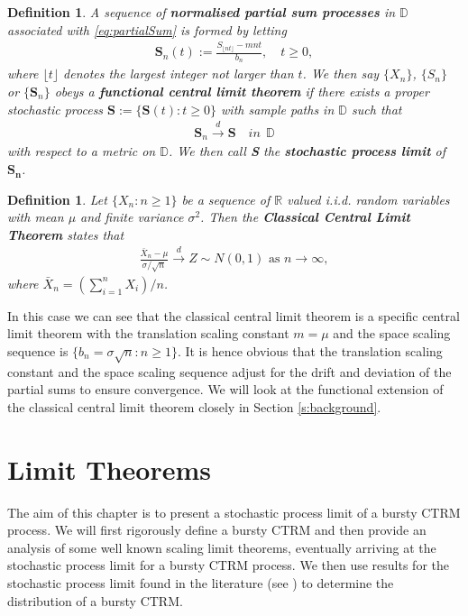 \documentclass[honours,12pt]{unswthesis}
\newcommand{\R}{\mathbb{R}}
\newcommand{\1}{\mathbf 1}
\newcommand{\Floor}[1]{{\lfloor {#1} \rfloor}}
\newcommand{\cd}{\overset{d}{\longrightarrow}}
\newcommand{\D}{\mathbb{D}}
\newtheorem{definition}[equation]{Definition}
\numberwithin{equation}{section}
\theoremstyle{definition}
\theoremstyle{remark}
\begin{document}
\begin{definition}
	A sequence of \textbf{normalised partial sum processes} in $\D$ associated with \ref{eq:partialSum} is formed by letting
	\begin{align}
		\textbf{S}_n(t):=\frac{S_\Floor{nt}-mnt}{b_n},\quad t\geq 0,
	\end{align}
	where $\lfloor t \rfloor$ denotes the largest integer not larger than $t$. We then say $\{X_n\}$, $\{S_n\}$ or $\{\textbf{S}_n\}$ obeys a \textbf{functional central limit theorem} if there exists a proper stochastic process $\textbf{S}:=\{\textbf{S}(t):t\geq0\}$ with sample paths in $\D$ such that
	\begin{align*}
		\textbf{S}_n \cd \textbf{S}\quad in\ \ \D
	\end{align*}
	with respect to a metric on $\D$. We then call \textbf{S} the \textbf{stochastic process limit} of $\boldsymbol{S_n}$.\\
\end{definition}


\begin{definition}
Let $\{X_n:n\geq1\}$ be a sequence of $\R$ valued i.i.d. random variables with mean $\mu$ and finite variance $\sigma^2$. Then the \textbf{Classical Central Limit Theorem} states that
\begin{align*}
	\frac{\bar{X}_n-\mu}{\sigma/\sqrt{n}} \cd Z \sim N(0,1) \textrm{ as 				$n\to\infty,$}
\end{align*}
where $\bar{X}_n=(\sum^n_{i=1}X_i)/n$.\\
\end{definition}
In this case we can see that the classical central limit theorem is a specific central limit theorem with the translation scaling constant $m=\mu$ and the space scaling sequence is $\{b_n=\sigma\sqrt{n}:n\geq1 \}$. It is hence obvious that the translation scaling constant and the space scaling sequence adjust for the drift and deviation of the partial sums to ensure convergence. We will look at the functional extension of the classical central limit theorem closely in Section \ref{s:background}.

\chapter{Limit Theorems}
The aim of this chapter is to present a stochastic process limit of a bursty CTRM process. We will first rigorously define a bursty CTRM and then provide an analysis of some well known scaling limit theorems, eventually arriving at the stochastic process limit for a bursty CTRM process. We then use results for the stochastic process limit found in the literature (see \cite{MeerschaertStoev08}) to determine the distribution of a bursty CTRM.
\end{document}
